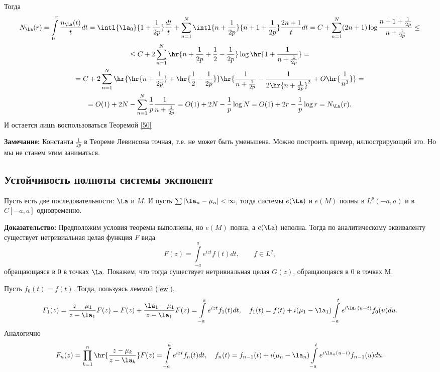 \documentclass[a4paper]{article}
\begin{document}
Тогда
\begin{multline*}
N_{\La}(r)=\int\limits_0^r\frac{n_{\La}(t)}tdt=\intl{\la_0}{1+\frac1{2p}}\frac{dt}t+\sum\limits_{n=1}^N\intl{n+\frac1{2p}}{n+1+\frac1{2p}}\frac{2n+1}t
dt=C+\sum\limits_{n=1}^N(2n+1)\log\frac{n+1+\frac1{2p}}{n+\frac1{2p}}\le\\
\le
C+2\sum\limits_{n=1}^N\hr{n+\frac1{2p}+\frac12-\frac1{2p}}\log\hr{1+\frac1{n+\frac1{2p}}}=\\
=C+2\sum\limits_{n=1}^N\hr{\hr{n+\frac1{2p}}+\hr{\frac12-\frac1{2p}}}\hr{\frac1{n+\frac1{2p}}-\frac1{2\hr{n+\frac1{2p}}^2}+O\hr{\frac1{n^3}}}=\\
=O(1)+2N-\sum\limits_{n=1}^N\frac1p\frac1{n+\frac1{2p}}=O(1)+2N-\frac1p\log
N=O(1)+2r-\frac1p\log r=N_{\La}(r).
\end{multline*}
И остается лишь воспользоваться Теоремой \ref{50}

\noindent\textbf{Замечание:} Константа $\frac1{2p}$ в Теореме
Левинсона точная, т.е. не может быть уменьшена. Можно построить
пример, иллюстрирующий это. Но мы не станем этим заниматься.

\subsection{Устойчивость полноты системы экспонент}
\begin{theorems}
Пусть есть две последовательности: $\La$ и $M$. И пусть
$\sum|\la_n-\mu_n|<\infty$, тогда системы $e(\La)$ и
$e(M)$ полны в $L^p(-a,a)$ и в $C[-a,a]$ одновременно.
\end{theorems}
\textbf{Доказательство:} Предположим условия теоремы выполнены, но
$e(M)$ полна, а $e(\La)$ неполна. Тогда по аналитическому
эквиваленту существует нетривиальная целая функция $F$ вида
$$F(z)=\int\limits_{-a}^a e^{izt}f(t)dt,\qquad f\in L^q,$$
обращающаяся в $0$ в точках $\La.$ Покажем, что тогда
существует нетривиальная целая $G(z)$, обращающаяся в $0$ в точках
M.

Пусть $f_0(t)=f(t)$. Тогда, пользуясь леммой (\ref{ew}),
\begin{equation*}
F_1(z)=\frac{z-\mu_1}{z-\la_1}F(z)=F(z)+\frac{\la_1-\mu_1}{z-\la_1}F(z)=\int\limits_{-a}^ae^{izt}f_1(t)dt,\quad
f_1(t)=f(t)+i(\mu_1-\la_1)\int\limits_{-a}^te^{i\la_1(u-t)}f_0(u)du.
\end{equation*}
Аналогично
\begin{equation*}
F_n(z)=\prod\limits_{k=1}^n\hr{\frac{z-\mu_k}{z-\la_k}}F(z)=\int\limits_{-a}^ae^{izt}f_n(t)dt,\quad
f_n(t)=f_{n-1}(t)+i(\mu_n-\la_n)\int\limits_{-a}^te^{i\la_n(u-t)}f_{n-1}(u)du.
\end{equation*}
\end{document}
